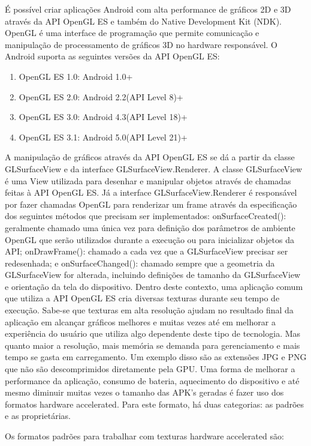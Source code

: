 \documentclass[sigconf]{acmart}
\begin{document}
É possível criar aplicações Android com alta performance de gráficos 2D e 3D através da API OpenGL ES e também do Native Development Kit (NDK). OpenGL é uma interface de programação que permite comunicação e manipulação de processamento de gráficos 3D no hardware responsável. O Android suporta as seguintes versões da API OpenGL ES:
\begin{enumerate}
    \item OpenGL ES 1.0: Android 1.0+
    \item OpenGL ES 2.0: Android 2.2(API Level 8)+
    \item OpenGL ES 3.0: Android 4.3(API Level 18)+
    \item OpenGL ES 3.1: Android 5.0(API Level 21)+
\end{enumerate}

A manipulação de gráficos através da API OpenGL ES se dá a partir da classe GLSurfaceView e da interface GLSurfaceView.Renderer.
A classe GLSurfaceView é uma View utilizada para desenhar e manipular objetos através de chamadas feitas à API OpenGL ES. Já a interface GLSurfaceView.Renderer é responsável por fazer chamadas OpenGL para renderizar um frame através da especificação dos seguintes métodos que precisam ser implementados:
onSurfaceCreated(): geralmente chamado uma única vez para definição dos parâmetros de ambiente OpenGL que serão utilizados durante a execução ou para inicializar objetos da API;
onDrawFrame(): chamado a cada vez que a GLSurfaceView precisar ser redesenhada;
e onSurfaceChanged(): chamado sempre que a geometria da GLSurfaceView for alterada, incluindo definições de tamanho da GLSurfaceView e orientação da tela do dispositivo.
Dentro deste contexto, uma aplicação comum que utiliza a API OpenGL ES cria diversas texturas durante seu tempo de execução. Sabe-se que texturas em alta resolução ajudam no resultado final da aplicação em alcançar gráficos melhores e muitas vezes até em melhorar a experiência do usuário que utiliza algo dependente deste tipo de tecnologia. Mas quanto maior a resolução, mais memória se demanda para gerenciamento e mais tempo se gasta em carregamento. Um exemplo disso são as extensões JPG e PNG que não são descomprimidos diretamente pela GPU.
Uma forma de melhorar a performance da aplicação, consumo de bateria, aquecimento do dispositivo e até mesmo diminuir muitas vezes o tamanho das APK's geradas é fazer uso dos formatos hardware accelerated. Para este formato, há duas categorias: as padrões e as proprietárias.

Os formatos padrões para trabalhar com texturas hardware accelerated são:
\end{document}
